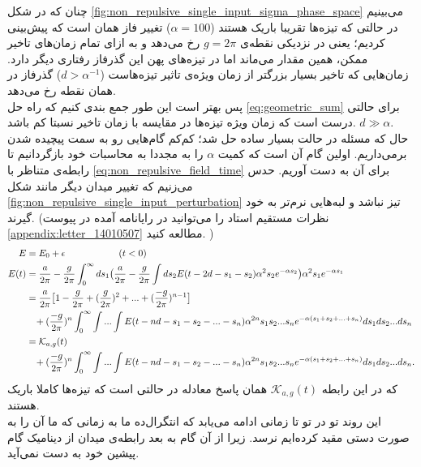چنان که در شکل \ref{fig:non_repulsive_single_input_sigma_phase_space} می‌بینیم در حالتی که تیزه‌ها تقریبا باریک هستند ($\alpha = 100$) تغییر فاز همان است که پیش‌بینی کردیم؛ یعنی در نزدیکی نقطه‌ی 
$g = 2\pi$
رخ می‌دهد و به ازای تمام زمان‌های تاخیر ممکن، همین مقدار می‌ماند اما در تیزه‌های پهن این گذرفاز رفتاری دیگر دارد. زمان‌هایی که تاخیر بسیار بزرگتر از زمان ویژه‌ی تاثیر تیزه‌هاست
($d > \alpha^{-1}$)
گذرفاز در همان نقطه رخ می‌دهد.\\

پس بهتر است این طور جمع بندی‌ کنیم که راه حل
\ref{eq:geometric_sum}
برای حالتی درست است که زمان ویژه تیزه‌ها در مقایسه با زمان تاخیر نسبتا کم باشد.
$d \gg \alpha$.
\\
حال که مسئله در حالت بسیار ساده حل شد؛ کم‌کم گام‌هایی رو به سمت پیچیده شدن برمی‌داریم. اولین گام آن است که کمیت $\alpha$ را به مجددا به محاسبات خود بازگردانیم تا رابطه‌ی متناظر با
\ref{eq:non_repulsive_field_time}
برای آن به دست آوریم. حدس می‌زنیم که تغییر میدان دیگر مانند شکل 
\ref{fig:non_repulsive_single_input_perturbation}
تیز نباشد و لبه‌هایی نرم‌تر به خود گیرند. (نظرات مستقیم استاد را می‌توانید در رایانامه آمده در پیوست
\ref{appendix:letter_14010507}
مطالعه کنید.
)
\begin{align}
	E &= E_0 + \epsilon \hspace{2cm} (t<0) \\
	E(t) &= \frac{a}{2\pi} - \frac{g}{2\pi} \int_{0}^{\infty} ds_1 \big( \frac{a}{2\pi} - \frac{g}{2\pi} \int ds_2 E(t - 2d - s_1 - s_2) \alpha^2 s_2 e^{-\alpha s_2} \big) \alpha^2 s_1 e^{-\alpha s_1} \\
	&= \frac{a}{2\pi} \big[ 1 - \frac{g}{2\pi} + (\frac{g}{2\pi})^2 + ... + (\frac{-g}{2\pi})^{n - 1} \big] \\
	&\hspace{3mm}+ (\frac{-g}{2\pi})^{n} \int_{0}^{\infty}\int ... \int E(t - nd - s_1 - s_2 - ... - s_n) \alpha^{2n} s_1 s_2 ... s_n e^{-\alpha(s_1 + s_2 + ... + s_n)} ds_1 ds_2 ... ds_n\\
	&= \mathcal{K}_{a,g}(t)\\
	&\hspace{3mm}+ (\frac{-g}{2\pi})^{n} \int_{0}^{\infty}\int ... \int E(t - nd - s_1 - s_2 - ... - s_n) \alpha^{2n} s_1 s_2 ... s_n e^{-\alpha(s_1 + s_2 + ... + s_n)} ds_1 ds_2 ... ds_n .
\end{align}
که در این رابطه 
$\mathcal{K}_{a,g}(t)$
همان پاسخ معادله در حالتی است که تیزه‌ها کاملا باریک هستند. \\
این روند تو در تو تا زمانی ادامه می‌یابد که انتگرال‌ده ما به زمانی که ما آن را به صورت دستی مقید کرده‌ایم نرسد. زیرا از آن گام به بعد رابطه‌ی میدان از دینامیک گام پیشین خود به دست نمی‌آید.\\
